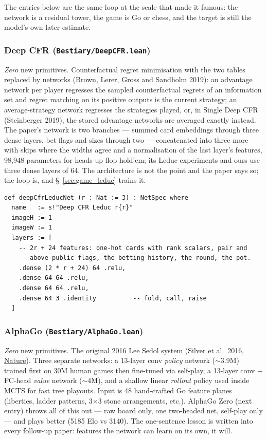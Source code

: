 The entries below are the same loop at the scale that made it famous: the network is
a residual tower, the game is Go or chess, and the target is still the model's own
later estimate.

\subsubsection*{Deep CFR (\texttt{Bestiary/DeepCFR.lean})}
\emph{Zero} new primitives. Counterfactual regret minimisation with the two tables
replaced by networks (Brown, Lerer, Gross and Sandholm 2019): an advantage network per
player regresses the sampled counterfactual regrets of an information set and regret
matching on its positive outputs is the current strategy; an average-strategy network
regresses the strategies played, or, in Single Deep CFR (Steinberger 2019), the stored
advantage networks are averaged exactly instead. The paper's network is two branches ---
summed card embeddings through three dense layers, bet flags and sizes through two ---
concatenated into three more with skips where the widths agree and a normalisation of
the last layer's features, 98,948 parameters for heads-up flop hold'em; its Leduc
experiments and ours use three dense layers of 64. The architecture is not the point and
the paper says so; the loop is, and \S~\ref{sec:game_leduc} trains it.

\begin{verbatim}
def deepCfrLeducNet (r : Nat := 3) : NetSpec where
  name   := s!"Deep CFR Leduc r{r}"
  imageH := 1
  imageW := 1
  layers := [
    -- 2r + 24 features: one-hot cards with rank scalars, pair and
    -- above-public flags, the betting history, the round, the pot.
    .dense (2 * r + 24) 64 .relu,
    .dense 64 64 .relu,
    .dense 64 64 .relu,
    .dense 64 3 .identity          -- fold, call, raise
  ]
\end{verbatim}

\subsubsection*{AlphaGo (\texttt{Bestiary/AlphaGo.lean})}
\emph{Zero} new primitives. The original 2016 Lee Sedol system
(Silver et al.\ 2016,
\href{https://www.nature.com/articles/nature16961}{Nature}).
Three separate networks: a 13-layer conv \emph{policy} network
($\sim$3.9M) trained first on 30M human games then fine-tuned via
self-play, a 13-layer conv + FC-head \emph{value} network
($\sim$4M), and a shallow linear \emph{rollout} policy used inside
MCTS for fast tree playouts. Input is 48 hand-crafted Go feature
planes (liberties, ladder patterns, 3$\times$3 stone arrangements,
etc.). AlphaGo Zero (next entry) throws all of this out --- raw
board only, one two-headed net, self-play only --- and plays better
(5185 Elo vs 3140). The one-sentence lesson is written into every
follow-up paper: features the network can learn on its own, it will.

